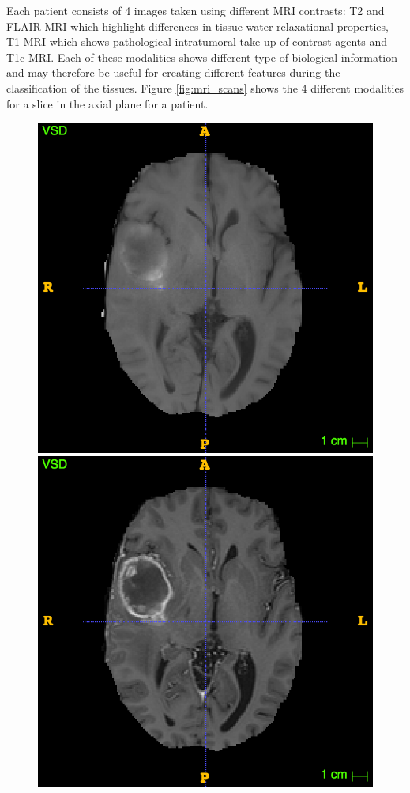 \documentclass[12pt,a4paper,twoside,openright]{report}
\begin{document}
Each patient consists of 4 images taken using different MRI contrasts: T2 and FLAIR MRI which highlight differences in tissue water relaxational properties, T1 MRI which shows pathological intratumoral take-up of contrast agents and T1c MRI. Each of these modalities shows different type of biological information and may therefore be useful for creating different features during the classification of the tissues.
Figure \ref{fig:mri_scans} shows the 4 different modalities for a slice in the axial plane for a patient. 
\begin{figure}[h]
	\centering
	\includegraphics[scale=0.15]{T1_example}
	\includegraphics[scale=0.15]{T1c_example}

\end{figure}
\end{document}
